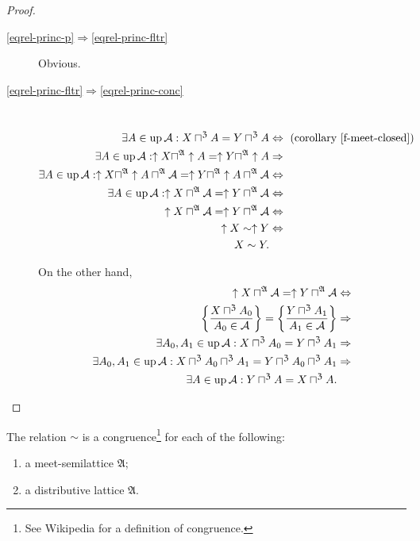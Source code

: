 \begin{proof}
~
\begin{description}
\item [{\ref{eqrel-princ-p}$\Rightarrow$\ref{eqrel-princ-fltr}}] Obvious.
\item [{\ref{eqrel-princ-fltr}$\Rightarrow$\ref{eqrel-princ-conc}}] ~
\begin{align*}
\exists A\in\operatorname{up}\mathcal{A}:X\sqcap^{\mathfrak{Z}}A=Y\sqcap^{\mathfrak{Z}}A & \Leftrightarrow \text{ (corollary~\ref{f-meet-closed})}\\
\exists A\in\operatorname{up}\mathcal{A}:\uparrow X\sqcap^{\mathfrak{A}}\uparrow A=\uparrow Y\sqcap^{\mathfrak{A}}\uparrow A & \Rightarrow\\
\exists A\in\operatorname{up}\mathcal{A}:\uparrow X\sqcap^{\mathfrak{A}}\uparrow A\sqcap^{\mathfrak{A}}\mathcal{A}=\uparrow Y\sqcap^{\mathfrak{A}}\uparrow A\sqcap^{\mathfrak{A}}\mathcal{A} & \Leftrightarrow\\
\exists A\in\operatorname{up}\mathcal{A}:\uparrow X\sqcap^{\mathfrak{A}}\mathcal{A}=\uparrow Y\sqcap^{\mathfrak{A}}\mathcal{A} & \Leftrightarrow\\
\uparrow X\sqcap^{\mathfrak{A}}\mathcal{A}=\uparrow Y\sqcap^{\mathfrak{A}}\mathcal{A} & \Leftrightarrow\\
\uparrow X\sim\uparrow Y & \Leftrightarrow\\
X\sim Y.
\end{align*}



On the other hand,
\begin{align*}
\uparrow X\sqcap^{\mathfrak{A}}\mathcal{A}=\uparrow Y\sqcap^{\mathfrak{A}}\mathcal{A} & \Leftrightarrow\\
\left\{ \frac{X\sqcap^{\mathfrak{Z}}A_{0}}{A_{0}\in\mathcal{A}}\right\}=\left\{ \frac{Y\sqcap^{\mathfrak{Z}}A_{1}}{A_{1}\in\mathcal{A}}\right\} & \Rightarrow\\
\exists A_{0},A_{1}\in\operatorname{up}\mathcal{A}:X\sqcap^{\mathfrak{Z}}A_{0}=Y\sqcap^{\mathfrak{Z}}A_{1} & \Rightarrow\\
\exists A_{0},A_{1}\in\operatorname{up}\mathcal{A}:X\sqcap^{\mathfrak{Z}}A_{0}\sqcap^{\mathfrak{Z}}A_{1}=Y\sqcap^{\mathfrak{Z}}A_{0}\sqcap^{\mathfrak{Z}}A_{1} & \Rightarrow\\
\exists A\in\operatorname{up}\mathcal{A}:Y\sqcap^{\mathfrak{Z}}A=X\sqcap^{\mathfrak{Z}}A.
\end{align*}


\end{description}
\end{proof}
\begin{prop}
The relation $\sim$ is a congruence\footnote{See Wikipedia for a definition of congruence.}
for each of the following:
\begin{enumerate}
\item \label{cong-mslat}a meet-semilattice $\mathfrak{A}$;
\item \label{cong-dist}a distributive lattice $\mathfrak{A}$.
\end{enumerate}
\end{prop}
